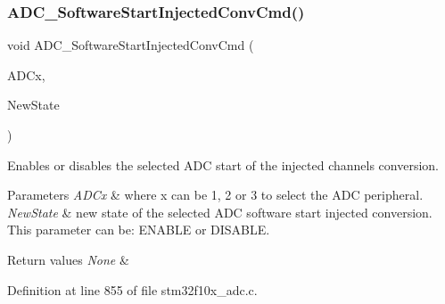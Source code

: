 \mbox{\label{group___a_d_c___private___functions_ga5b141d5dbf5f417a11dfa622c8c149d3}} 
\subsubsection{\texorpdfstring{A\+D\+C\+\_\+\+Software\+Start\+Injected\+Conv\+Cmd()}{ADC\_SoftwareStartInjectedConvCmd()}}
{\footnotesize\ttfamily void A\+D\+C\+\_\+\+Software\+Start\+Injected\+Conv\+Cmd (\begin{DoxyParamCaption}\item[{\hyperlink{struct_a_d_c___type_def}{A\+D\+C\+\_\+\+Type\+Def} $\ast$}]{A\+D\+Cx,  }\item[{\hyperlink{group___exported__types_gac9a7e9a35d2513ec15c3b537aaa4fba1}{Functional\+State}}]{New\+State }\end{DoxyParamCaption})}



Enables or disables the selected A\+DC start of the injected channels conversion. 


\begin{DoxyParams}{Parameters}
{\em A\+D\+Cx} & where x can be 1, 2 or 3 to select the A\+DC peripheral. \\
\hline
{\em New\+State} & new state of the selected A\+DC software start injected conversion. This parameter can be\+: E\+N\+A\+B\+LE or D\+I\+S\+A\+B\+LE. \\
\hline
\end{DoxyParams}

\begin{DoxyRetVals}{Return values}
{\em None} & \\
\hline
\end{DoxyRetVals}


Definition at line 855 of file stm32f10x\+\_\+adc.\+c.

\mbox{\label{group___a_d_c___private___functions_gadcba6341124a6aabfd2dd885ca8e5f14}} 
